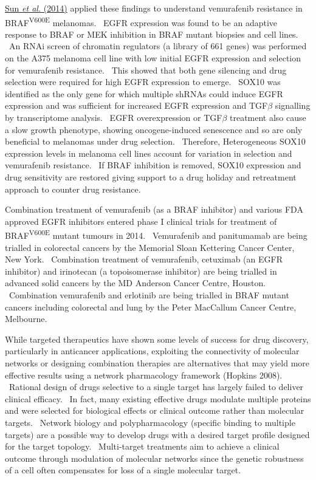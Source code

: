 \hyperlink{ENREF92}{Sun}\hyperlink{ENREF92}{\textit{ et al.}}\hyperlink{ENREF92}{ (2014)} applied these findings to understand vemurafenib resistance in BRAF\textsuperscript{V600E} melanomas. \ EGFR expression was found to be an adaptive response to BRAF or MEK inhibition in BRAF mutant biopsies and cell lines. \ An RNAi screen of chromatin regulators (a library of 661 genes) was performed on the A375 melanoma cell line with low initial EGFR expression and selection for vemurafenib resistance. \ This showed that both gene silencing and drug selection were required for high EGFR expression to emerge. \ SOX10 was identified as the only gene for which multiple shRNAs could induce EGFR expression and was sufficient for increased EGFR expression and TGF$\beta $ signalling by transcriptome analysis. \ EGFR overexpression or TGF$\beta $ treatment also cause a slow growth phenotype, showing oncogene-induced senescence and so are only beneficial to melanomas under drug selection. \ Therefore, Heterogeneous SOX10 expression levels in melanoma cell lines account for variation in selection and vemurafenib resistance. \ If BRAF inhibition is removed, SOX10 expression and drug sensitivity are restored giving support to a drug holiday and retreatment approach to counter drug resistance. \  

Combination treatment of vemurafenib (as a BRAF inhibitor) and various FDA approved EGFR inhibitors entered phase I clinical trials for treatment of BRAF\textsuperscript{V600E} mutant tumours in 2014. \ Vemurafenib and panitumamab are being trialled in colorectal cancers by the Memorial Sloan Kettering Cancer Center, New York. \ Combination treatment of vemurafenib, cetuximab (an EGFR inhibitor) and irinotecan (a topoisomerase inhibitor) are being trialled in advanced solid cancers by the MD Anderson Cancer Centre, Houston. \ Combination vemurafenib and erlotinib are being trialled in BRAF mutant cancers including colorectal and lung by the Peter MacCallum Cancer Centre, Melbourne. \  


While targeted therapeutics have shown some levels of success for drug discovery, particularly in anticancer applications, exploiting the connectivity of molecular networks or designing combination therapies are alternatives that may yield more effective results using a network pharmacology framework (Hopkins 2008). \ Rational design of drugs selective to a single target has largely failed to deliver clinical efficacy. \ In fact, many existing effective drugs modulate multiple proteins and were selected for biological effects or clinical outcome rather than molecular targets. \ Network biology and polypharmacology (specific binding to multiple targets) are a possible way to develop drugs with a desired target profile designed for the target topology. \ Multi-target treatments aim to achieve a clinical outcome through modulation of molecular networks since the genetic robustness of a cell often compensates for loss of a single molecular target. \  

